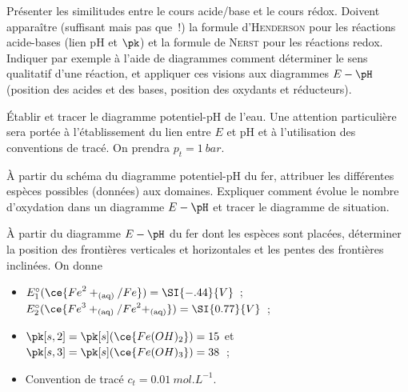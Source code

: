 \documentclass[a4paper, 11pt, final, garamond]{book}
\begin{document}
\begin{enumerate}[label=\sqenumi]
	\litem{23pt}{\str}%
	Présenter les similitudes entre le cours acide/base et le cours rédox.
	Doivent apparaître (suffisant mais pas que~!) la formule
	d'\textsc{Henderson} pour les réactions acide-bases (lien pH et $\pk$) et
	la formule de \textsc{Nerst} pour les réactions redox. Indiquer par
	exemple à l'aide de diagrammes comment déterminer le sens qualitatif d'une
	réaction, et appliquer ces visions aux diagrammes $E-\pH$ (position des
	acides et des bases, position des oxydants et réducteurs).

	\litem{23pt}{\strr}%
	Établir et tracer le diagramme potentiel-pH de l'eau. Une attention
	particulière sera portée à l'établissement du lien entre $E$ et pH et à
	l'utilisation des conventions de tracé. On prendra $p_t = \SI{1}{bar}$.

	\litem{23pt}{\strr}%
	À partir du schéma du diagramme potentiel-pH du fer, attribuer les
	différentes espèces possibles (données) aux domaines. Expliquer comment
	évolue le nombre d'oxydation dans un diagramme $E-\pH$ et tracer le
	diagramme de situation.

	\litem{23pt}{\strrr}%
	À partir du diagramme $E-\pH$ du fer dont les espèces sont placées,
	déterminer la position des frontières verticales et horizontales et les
	pentes des frontières inclinées. On donne
	\begin{itemize}
		\item $E_1^\circ(\ce{{Fe}^2+_{\rm(aq)}/Fe}) = \SI{-.44}{V}$~;
		      $E_2^\circ(\ce{{Fe}^3+_{\rm(aq)}/{Fe}^2+_{\rm(aq)}}) = \SI{0.77}{V}$~;
		\item $\pk[s,2] = \pk[s](\ce{Fe(OH)_2}) = 15$ et $\pk[s,3] =
			      \pk[s](\ce{Fe(OH)_3}) = 38$~;
		\item Convention de tracé $c_t = \SI{0.01}{mol.L^{-1}}$.
	\end{itemize}
\end{enumerate}
\end{document}
